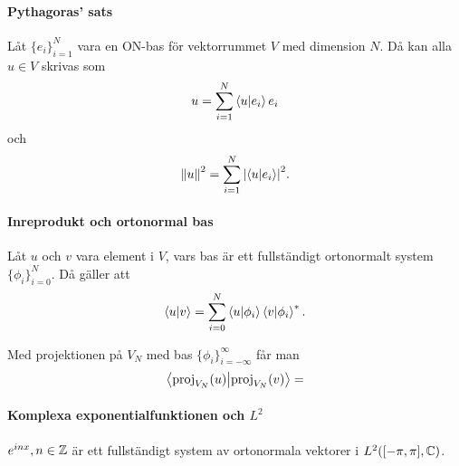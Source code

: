 \proof

\paragraph{Pythagoras' sats}
Låt $\{e_{i}\}_{i = 1}^{N}$ vara en ON-bas för vektorrummet $V$ med dimension $N$. Då kan alla $u\in V$ skrivas som
\begin{align*}
	u = \sum\limits_{i = 1}^{N}\bra{u}\ket{e_{i}}e_{i}
\end{align*}
och
\begin{align*}
	\norm{u}^{2} = \sum\limits_{i = 1}^{N}\abs{\bra{u}\ket{e_{i}}}^{2}.
\end{align*}

\proof

\paragraph{Inreprodukt och ortonormal bas}
Låt $u$ och $v$ vara element i $V$, vars bas är ett fullständigt ortonormalt system $\{\phi_{i}\}_{i = 0}^{N}$. Då gäller att
\begin{align*}
	\bra{u}\ket{v} = \sum\limits_{i = 0}^{N}\bra{u}\ket{\phi_{i}}\bra{v}\ket{\phi_{i}}^{*}.
\end{align*}

\proof
Med projektionen på $V_{N}$ med bas $\{\phi_{i}\}_{i = -\infty}^{\infty}$ får man
\begin{align*}
	\bra{\text{proj}_{V_{N}}(u)}\ket{\text{proj}_{V_{N}}(v)} = 
\end{align*}

\paragraph{Komplexa exponentialfunktionen och $L^{2}$}
$e^{inx}, n\in\mathbb{Z}$ är ett fullständigt system av ortonormala vektorer i $L^{2}([-\pi, \pi], \mathbb{C})$.

